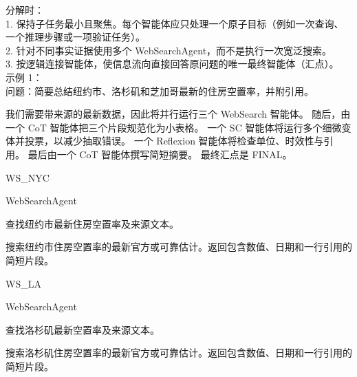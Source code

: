 \begin{userprompt}[title={用户提示词}]
分解时：\\

1. 保持子任务最小且聚焦。每个智能体应只处理一个原子目标（例如一次查询、一个推理步骤或一项验证任务）。\\
2. 针对不同事实证据使用多个 WebSearchAgent，而不是执行一次宽泛搜索。\\
3. 按逻辑连接智能体，使信息流向直接回答原问题的唯一最终智能体（汇点）。\\


示例 1：\\

问题：简要总结纽约市、洛杉矶和芝加哥最新的住房空置率，并附引用。\\



我们需要带来源的最新数据，因此将并行运行三个 WebSearch 智能体。
随后，由一个 CoT 智能体把三个片段规范化为小表格。
一个 SC 智能体将运行多个细微变体并投票，以减少抽取错误。
一个 Reflexion 智能体将检查单位、时效性与引用。
最后由一个 CoT 智能体撰写简短摘要。
最终汇点是 FINAL。



\quad{}WS\_NYC

\quad{}WebSearchAgent

\quad{}
查找纽约市最新住房空置率及来源文本。

\quad{}

\qquad{}
搜索纽约市住房空置率的最新官方或可靠估计。返回包含数值、日期和一行引用的简短片段。

\quad{}



\quad{}WS\_LA

\quad{}WebSearchAgent

\quad{}
查找洛杉矶最新空置率及来源文本。

\quad{}

\qquad{}
搜索洛杉矶住房空置率的最新官方或可靠估计。返回包含数值、日期和一行引用的简短片段。

\quad{}


\end{userprompt}
